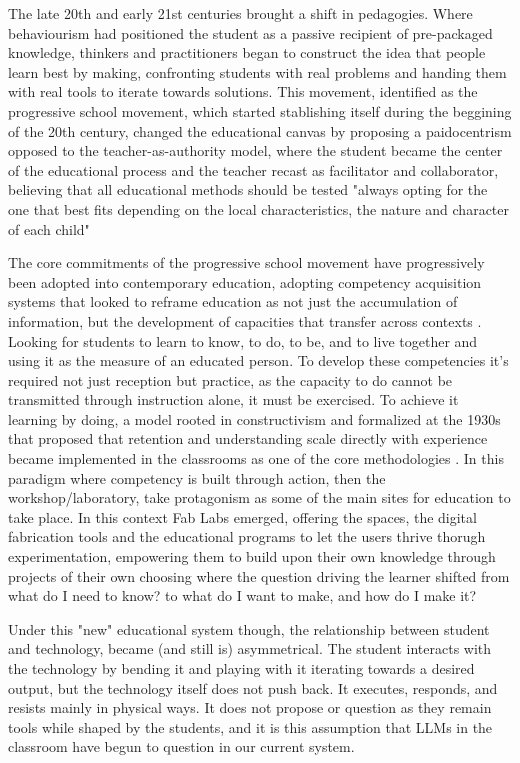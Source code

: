 \documentclass{article}
\begin{document}
The late 20th and early 21st centuries brought a shift in pedagogies. Where behaviourism had positioned the student as a passive recipient of pre-packaged knowledge, thinkers and practitioners began to construct the idea that people learn best by making, confronting students with real problems and handing them with real tools to iterate towards solutions. This movement, identified as the progressive school movement, which started stablishing itself during the beggining of the 20th century, changed the educational canvas by proposing a paidocentrism opposed to the teacher-as-authority model, where the student became the center of the educational process and the teacher recast as facilitator and collaborator, believing that all educational methods should be tested "always opting for the one that best fits depending on the local characteristics, the nature and character of each child" \cite{sola1980educacio}

The core commitments of the progressive school movement have progressively been adopted into contemporary education, adopting competency acquisition systems that looked to reframe education as not just the accumulation of information, but the development of capacities that transfer across contexts \cite{decret175_2022}. Looking for students to learn to know, to do, to be, and to live together \cite{tawil2013} and using it as the measure of an educated person. To develop these competencies it's required not just reception but practice, as the capacity to do cannot be transmitted through instruction alone, it must be exercised. To achieve it learning by doing, a model rooted in constructivism and formalized at the 1930s that proposed that retention and understanding scale directly with experience \cite{rodriguez2014aprender} became implemented in the classrooms as one of the core methodologies \cite{lomloe2020}. In this paradigm where competency is built through action, then the workshop/laboratory, take protagonism as some of the main sites for education to take place. In this context Fab Labs emerged, offering the spaces, the digital fabrication tools and the educational programs \cite{academany} to let the users thrive thorugh experimentation, empowering them to build upon their own knowledge through projects of their own choosing where the question driving the learner shifted from what do I need to know? to what do I want to make, and how do I make it?

Under this "new" educational system though, the relationship between student and technology, became (and still is) asymmetrical. The student interacts with the technology by bending it and playing with it iterating towards a desired output, but the technology itself does not push back. It executes, responds, and resists mainly in physical ways. It does not propose or question as they remain tools while shaped by the students, and it is this assumption that LLMs in the classroom have begun to question in our current system.
\end{document}
